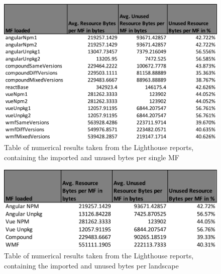 \newpage
\begin{figure}[!h]
	\centering
	\begin{adjustbox}{width=\textwidth}
		\includegraphics[]{Figures/lighthouse_json_2.pdf}
	\end{adjustbox}
	\caption{Table of numerical results taken from the Lighthouse reports, containing the imported and unused bytes per single MF}
	\label{fig:appendix_2_2}
\end{figure}



\begin{figure}[!h]
	\centering
	\begin{adjustbox}{width=\textwidth}
		\includegraphics[]{Figures/lighthouse_json_3.pdf}
	\end{adjustbox}
	\caption{Table of numerical results taken from the Lighthouse reports, containing the imported and unused bytes per landscape}
	\label{fig:appendix_2_3}
\end{figure}